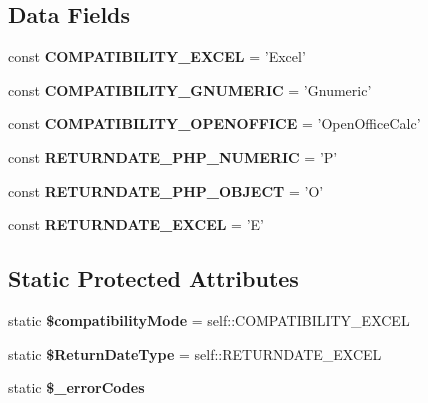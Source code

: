 \subsection*{Data Fields}
\begin{DoxyCompactItemize}
\item 
const {\bf C\+O\+M\+P\+A\+T\+I\+B\+I\+L\+I\+T\+Y\+\_\+\+E\+X\+C\+E\+L} = 'Excel'
\item 
const {\bfseries C\+O\+M\+P\+A\+T\+I\+B\+I\+L\+I\+T\+Y\+\_\+\+G\+N\+U\+M\+E\+R\+I\+C} = 'Gnumeric'\label{class_p_h_p_excel___calculation___functions_a4eab9c91856afdac696653968fb5453a}

\item 
const {\bfseries C\+O\+M\+P\+A\+T\+I\+B\+I\+L\+I\+T\+Y\+\_\+\+O\+P\+E\+N\+O\+F\+F\+I\+C\+E} = 'Open\+Office\+Calc'\label{class_p_h_p_excel___calculation___functions_ab5330d1b37465bebcc6ee7ebc88199b4}

\item 
const {\bfseries R\+E\+T\+U\+R\+N\+D\+A\+T\+E\+\_\+\+P\+H\+P\+\_\+\+N\+U\+M\+E\+R\+I\+C} = 'P'\label{class_p_h_p_excel___calculation___functions_a6901af1343fc28474e3b38c8e4894095}

\item 
const {\bfseries R\+E\+T\+U\+R\+N\+D\+A\+T\+E\+\_\+\+P\+H\+P\+\_\+\+O\+B\+J\+E\+C\+T} = 'O'\label{class_p_h_p_excel___calculation___functions_aa7cda5c46ef87cc5592c6fcc6c5c81d4}

\item 
const {\bfseries R\+E\+T\+U\+R\+N\+D\+A\+T\+E\+\_\+\+E\+X\+C\+E\+L} = 'E'\label{class_p_h_p_excel___calculation___functions_a8a64a446b25b03a49bc247274e2a71ad}

\end{DoxyCompactItemize}
\subsection*{Static Protected Attributes}
\begin{DoxyCompactItemize}
\item 
static {\bfseries \$compatibility\+Mode} = self\+::\+C\+O\+M\+P\+A\+T\+I\+B\+I\+L\+I\+T\+Y\+\_\+\+E\+X\+C\+E\+L\label{class_p_h_p_excel___calculation___functions_aa6a6b94218626625b96d13f096618582}

\item 
static {\bfseries \$\+Return\+Date\+Type} = self\+::\+R\+E\+T\+U\+R\+N\+D\+A\+T\+E\+\_\+\+E\+X\+C\+E\+L\label{class_p_h_p_excel___calculation___functions_a708dd57f1f6322ee572c14947352bd0f}

\item 
static {\bfseries \$\+\_\+error\+Codes}
\end{DoxyCompactItemize}


